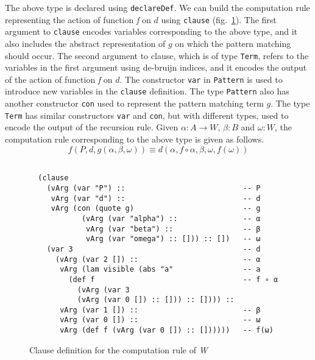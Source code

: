 \documentclass[sigplan,10pt]{acmart}
\begin{document}
The above type is declared using {\tt declareDef}. We can build the computation rule representing the action of function \emph{f} on $d$ using {\tt clause} (fig.~\ref{fig:ast-cdef}). The first argument to {\tt clause} encodes variables corresponding to the above type, and it also includes the abstract representation of $g$ on which the pattern matching should occur. The second argument to clause, which is of type {\tt Term}, refers to the variables in the first argument using de-bruijn indices, and it encodes the output of the action of function \emph{f} on $d$. The constructor {\tt var} in {\tt Pattern} is used to introduce new variables in the {\tt clause} definition. The type {\tt Pattern} also has another constructor {\tt con} used to represent the pattern matching term $g$. The type {\tt Term} has similar constructors {\tt var} and {\tt con}, but with different types, used to encode the output of the recursion rule. Given $\alpha : A \rightarrow W$, $\beta : B$ and $\omega : W$, the computation rule corresponding to the above type is given as follows.
\begin{equation}
f (P, d, g (\alpha, \beta, \omega)) \equiv d (\alpha, f \circ \alpha, \beta, \omega, f (\omega)) \nonumber
\end{equation}

\begin{figure}
\begin{center}
\begingroup
\fontsize{7pt}{9pt}\selectfont
\begin{Verbatim}[frame = single]

  (clause 
    (vArg (var "P") ::                           -- P
     vArg (var "d") ::                           -- d
     vArg (con (quote g)                         -- g
            (vArg (var "alpha") ::               -- α
             vArg (var "beta") ::                -- β
             vArg (var "omega") :: [])) :: [])   -- ω
    (var 3                                       -- d
      (vArg (var 2 []) ::                        -- α
       vArg (lam visible (abs "a"                -- a
         (def f                                  -- f ∘ α
           (vArg (var 3                     
           (vArg (var 0 []) :: [])) :: []))) ::
       vArg (var 1 []) ::                        -- β
       vArg (var 0 []) ::                        -- ω
       vArg (def f (vArg (var 0 []) :: [])))))   -- f(ω)

\end{Verbatim}
\endgroup
\end{center}
\caption{Clause definition for the computation rule of \emph{W}}
\label{fig:ast-cdef}
\end{figure}
\end{document}
